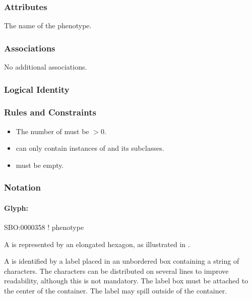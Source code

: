 \subsubsection{Attributes}

\begin{attributes}
   The name of the phenotype.
\end{attributes}

\subsubsection{Associations}

No additional associations.

\subsubsection{Logical Identity}

\begin{logicalkey}
\item {}
\item {}
\end{logicalkey}

\subsubsection{Rules and Constraints}

\begin{itemize}
\item The number of  must be $>0$.
\item {} can only contain instances of
 and its subclasses.
\item {} must be empty.
\end{itemize}

\subsubsection{Notation}

\paragraph{Glyph: }
\label{sec:phenotype}

\begin{glyphDescription}

\glyphSboTerm SBO:0000358 ! phenotype

\glyphContainer A  is represented by an elongated
hexagon, as illustrated in .

\glyphLabel A  is identified by a label placed in an
unbordered box containing a string of characters.  The characters can be
distributed on several lines to improve readability, although this is not
mandatory.  The label box must be attached to the center of the
 container.  The label may spill outside of the container.
\end{glyphDescription}
 
